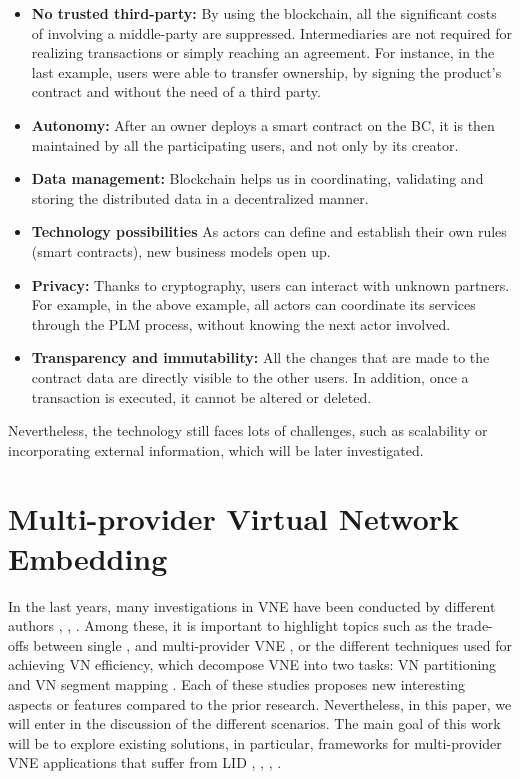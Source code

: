 \begin{itemize}
	\item \textbf{No trusted third-party:} By using the blockchain, all the significant costs of involving a middle-party are suppressed\citep{mainelli2015sharing}. Intermediaries are not required for realizing transactions or simply reaching an agreement. For instance, in the last example, users were able to transfer ownership, by signing the product's contract and without the need of a third party.
	\item \textbf{Autonomy:} After an owner deploys a smart contract on the BC, it is then maintained by all the participating users, and not only by its creator.
	\item \textbf{Data management:} Blockchain helps us in coordinating, validating and storing the distributed data in a decentralized manner.
	\item \textbf{Technology possibilities} As actors can define and establish their own rules (smart contracts), new business models open up.
	\item \textbf{Privacy:} Thanks to cryptography, users can interact with unknown partners. For example, in the above example, all actors can coordinate its services through the PLM process, without knowing the next actor involved. 
    \item \textbf{Transparency and immutability:} All the changes that are made to the contract data are directly visible to the other users. In addition, once a transaction is executed, it cannot be altered or deleted.
	
\end{itemize}

Nevertheless, the technology still faces lots of challenges, such as scalability or incorporating external information, which will be later investigated.

\section{Multi-provider Virtual Network Embedding}

In the last years, many investigations in VNE have been conducted by different authors \citep{houidi2011virtual}, \citep{zhu2008cabernet}, \citep{chowdhury2009virtual}. Among these, it is important to highlight topics such as the trade-offs between single \citep{chowdhury2009virtual}, \citep{houidi2008distributed} and multi-provider VNE \citep{dietrich2017multi}, or the different techniques used for achieving VN efficiency, which decompose VNE into two tasks: VN partitioning and VN segment mapping \citep{fischer2013virtual}. Each of these studies proposes new interesting aspects or features compared to the prior research. Nevertheless, in this paper, we will enter in the discussion of the different scenarios. The main goal of this work will be to explore existing solutions, in particular, frameworks for multi-provider VNE applications that suffer from LID \citep{dietrich2017multi}, \citep{zaheer2010multi}, \citep{esposito2013general}, \citep{chowdhury2010polyvine}.

